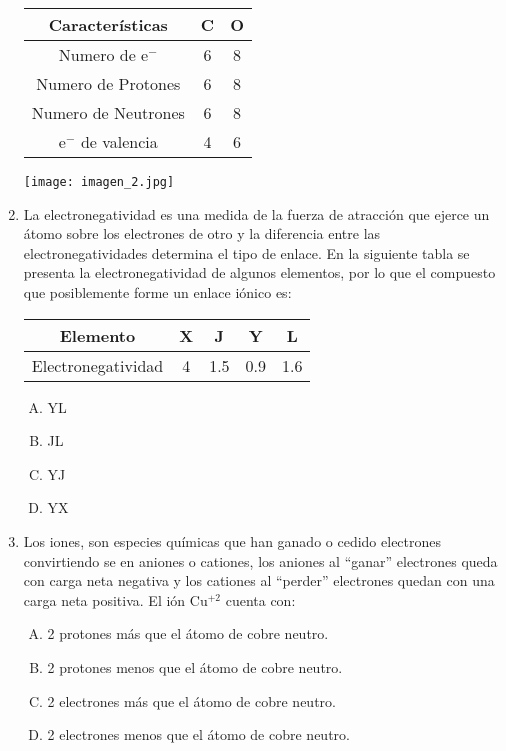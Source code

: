 \begin{enumerate}
\begin{center}
\begin{tabular}{|ccc|}
\hline 
Características & C & O \\  
\hline 
Numero de e$^-$ & 6 & 8 \\ 
Numero de Protones & 6 & 8 \\ 
Numero de Neutrones & 6 & 8 \\ 
e$^-$ de valencia & 4 & 6 \\ 
\hline 
\end{tabular} 
\end{center}

\texttt{[image: imagen\_2.jpg]}
\justifying


\item La electronegatividad es una medida de la fuerza de atracción que ejerce un átomo sobre los electrones de otro y la diferencia entre las electronegatividades determina el tipo de enlace.  
En la siguiente tabla se presenta la electronegatividad de algunos elementos, por lo que el compuesto que posiblemente forme un enlace iónico es: \label{mon-4}


\begin{center}
\begin{tabular}{|ccccc|}
\hline 
Elemento & X & J & Y & L \\ 
\hline 
Electronegatividad & 4 & 1.5 & 0.9 & 1.6 \\ 
\hline 
\end{tabular} 
\end{center}
\begin{enumerate}[(A)]
\item YL
\item JL
\item YJ
\item YX
\end{enumerate}

\item Los iones, son especies químicas que han ganado o cedido electrones convirtiendo se en aniones o cationes, los aniones al ``ganar'' electrones queda con carga neta negativa y los cationes al ``perder'' electrones quedan con una carga neta positiva. El ión Cu$^{+2}$ cuenta con: \label{mon-5}

\begin{enumerate}[(A)]
\item 2 protones más que el átomo de cobre neutro.
\item 2 protones menos que el átomo de cobre neutro.
\item 2 electrones más que el átomo de cobre neutro.
\item 2 electrones menos que el átomo de cobre neutro.
\end{enumerate}


\end{enumerate}
